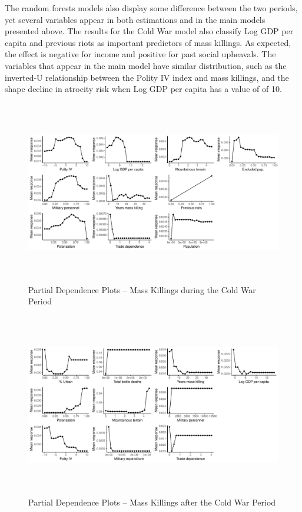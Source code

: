 The random forests models also display some difference between the two periods, yet several variables appear in both estimations and in the main models presented above. The results for the Cold War model also classify Log GDP per capita and previous riots as important predictors of mass killings. As expected, the effect is negative for income and positive for past social upheavals. The variables that appear in the main model have similar distribution, such as the inverted-U relationship between the Polity IV index and mass killings, and the shape decline in atrocity risk when Log GDP per capita has a value of of 10. 

\begin{figure}[H]
    \centering
    \includegraphics[width=\textwidth, height=8cm]{images/rf-coldwar-pd.pdf}
    \caption{Partial Dependence Plots -- Mass Killings during the Cold War Period}
    \label{fig:drfdpp2}
\end{figure}
	
\begin{figure}[H]
    \begin{center}
    \includegraphics[width=\textwidth, height=8cm]{images/rf-postcoldwar-pd.pdf}
    \caption{Partial Dependence Plots -- Mass Killings after the Cold War Period}
    \label{fig:drfdpp3}
    \end{center}
\end{figure}	

